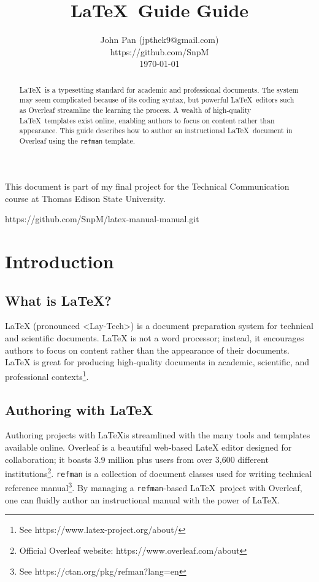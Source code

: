 \documentclass[twoside,a4paper]{refart}
\title{\LaTeX\ Guide Guide}
\author{
John Pan (jpthek9@gmail.com)\\
https://github.com/SnpM \\
\today\\
}
\date{}
\begin{document}
\maketitle

\begin{abstract}
         \LaTeX\ is a typesetting standard for academic and professional documents. The system may seem complicated because of its coding syntax, but powerful \LaTeX\ editors such as Overleaf streamline the learning the process. A wealth of high-quality \LaTeX\ templates exist online, enabling authors to focus on content rather than appearance. This guide describes how to author an instructional \LaTeX\ document in Overleaf using the \texttt{refman} template.
\end{abstract}

This document is part of my final project for the Technical Communication course at Thomas Edison State University.
\par
https://github.com/SnpM/latex-manual-manual.git

\tableofcontents

\newpage



\section{Introduction}

\subsection{What is \LaTeX?}
LaTeX (pronounced <Lay-Tech>) is a document preparation system for technical and scientiﬁc documents. LaTeX is not a word processor; instead, it encourages authors to focus on content rather than the appearance of their documents. LaTeX is great for producing high-quality documents in academic, scientific, and professional contexts\footnote{See https://www.latex-project.org/about/}.
\subsection{Authoring with \LaTeX}
Authoring projects with \LaTeX is streamlined with the many tools and templates available online. Overleaf is a beautiful web-based LateX editor designed for collaboration; it boasts 3.9 million plus users from over 3,600 diﬀerent institutions\footnote{Official Overleaf website: https://www.overleaf.com/about}. \texttt{refman} is a
collection of document classes used for writing technical reference manual\footnote{See https://ctan.org/pkg/refman?lang=en}. By managing a \texttt{refman}-based \LaTeX\ project with Overleaf, one can fluidly author an instructional manual with the power of \LaTeX.
\end{document}
